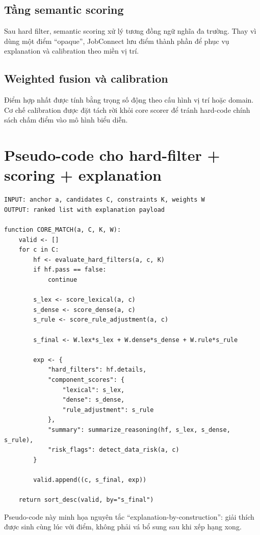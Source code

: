 \subsection{Tầng semantic scoring}

Sau hard filter, semantic scoring xử lý tương đồng ngữ nghĩa đa trường. Thay vì dùng một điểm ``opaque'', JobConnect lưu điểm thành phần để phục vụ explanation và calibration theo miền vị trí.

\subsection{Weighted fusion và calibration}

Điểm hợp nhất được tính bằng trọng số động theo cấu hình vị trí hoặc domain. Cơ chế calibration được đặt tách rời khỏi core scorer để tránh hard-code chính sách chấm điểm vào mô hình biểu diễn.

\section{Pseudo-code cho hard-filter + scoring + explanation}

\begin{lstlisting}[language={},caption={Pseudo-code lõi quyết định matching có giải thích},label={lst:core-matching-decision}]
INPUT: anchor a, candidates C, constraints K, weights W
OUTPUT: ranked list with explanation payload

function CORE_MATCH(a, C, K, W):
    valid <- []
    for c in C:
        hf <- evaluate_hard_filters(a, c, K)
        if hf.pass == false:
            continue

        s_lex <- score_lexical(a, c)
        s_dense <- score_dense(a, c)
        s_rule <- score_rule_adjustment(a, c)

        s_final <- W.lex*s_lex + W.dense*s_dense + W.rule*s_rule

        exp <- {
            "hard_filters": hf.details,
            "component_scores": {
                "lexical": s_lex,
                "dense": s_dense,
                "rule_adjustment": s_rule
            },
            "summary": summarize_reasoning(hf, s_lex, s_dense, s_rule),
            "risk_flags": detect_data_risk(a, c)
        }

        valid.append((c, s_final, exp))

    return sort_desc(valid, by="s_final")
\end{lstlisting}

Pseudo-code này minh họa nguyên tắc ``explanation-by-construction'': giải thích được sinh cùng lúc với điểm, không phải vá bổ sung sau khi xếp hạng xong.


